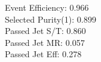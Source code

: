Event Efficiency:   0.966\\ 
Selected Purity(1): 0.899\\ 
Passed Jet S/T:     0.860\\ 
Passed Jet MR:      0.057\\ 
Passed Jet Eff:     0.278
